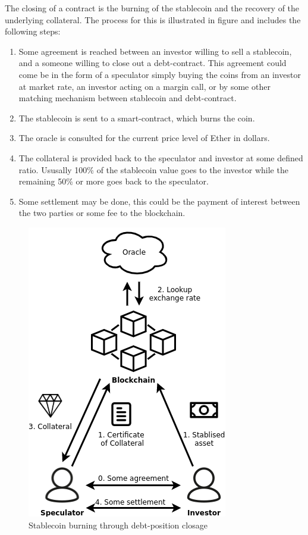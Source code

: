 \documentclass[english,]{IEEEtran}
\providecommand{\tightlist}{%
  \setlength{\itemsep}{0pt}\setlength{\parskip}{0pt}}
\begin{document}
The closing of a contract is the burning of the stablecoin and the
recovery of the underlying collateral. The process for this is
illustrated in figure \label{cdp_destroy_label} and includes the
following steps:

\begin{enumerate}
\def\labelenumi{\arabic{enumi}.}
\setcounter{enumi}{-1}
\tightlist
\item
  Some agreement is reached between an investor willing to sell a
  stablecoin, and a someone willing to close out a debt-contract. This
  agreement could come be in the form of a speculator simply buying the
  coins from an investor at market rate, an investor acting on a margin
  call, or by some other matching mechanism between stablecoin and
  debt-contract.
\item
  The stablecoin is sent to a smart-contract, which burns the coin.
\item
  The oracle is consulted for the current price level of Ether in
  dollars.
\item
  The collateral is provided back to the speculator and investor at some
  defined ratio. Ususally 100\% of the stablecoin value goes to the
  investor while the remaining 50\% or more goes back to the speculator.
\item
  Some settlement may be done, this could be the payment of interest
  between the two parties or some fee to the blockchain.
\end{enumerate}

\begin{figure}
\centering
\includegraphics{img/CDP_destroy.png}
\caption{Stablecoin burning through debt-position closage
\label{cdp_destroy_label}}
\end{figure}
\end{document}
